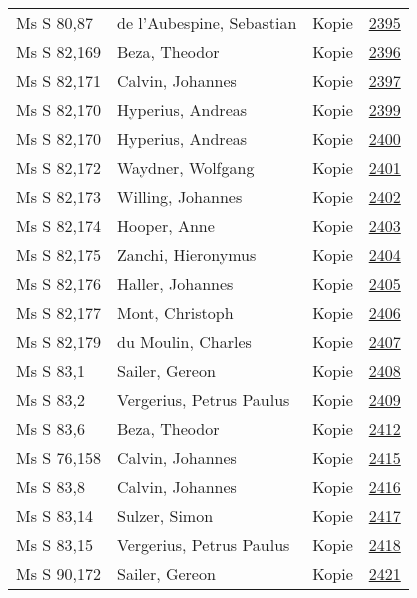 \documentclass[10pt,a4paper,landscape]{report}
\begin{document}
\begin{longtable}{p{16cm}p{4cm}lr}
Ms S 80,87	&	de l'Aubespine, Sebastian	&	Kopie	&	\href{http://130.60.24.72/assignment/2395}{2395}\\
Ms S 82,169	&	Beza, Theodor	&	Kopie	&	\href{http://130.60.24.72/assignment/2396}{2396}\\
Ms S 82,171	&	Calvin, Johannes	&	Kopie	&	\href{http://130.60.24.72/assignment/2397}{2397}\\
Ms S 82,170	&	Hyperius, Andreas	&	Kopie	&	\href{http://130.60.24.72/assignment/2399}{2399}\\
Ms S 82,170	&	Hyperius, Andreas	&	Kopie	&	\href{http://130.60.24.72/assignment/2400}{2400}\\
Ms S 82,172	&	Waydner, Wolfgang	&	Kopie	&	\href{http://130.60.24.72/assignment/2401}{2401}\\
Ms S 82,173	&	Willing, Johannes	&	Kopie	&	\href{http://130.60.24.72/assignment/2402}{2402}\\
Ms S 82,174	&	Hooper, Anne	&	Kopie	&	\href{http://130.60.24.72/assignment/2403}{2403}\\
Ms S 82,175	&	Zanchi, Hieronymus	&	Kopie	&	\href{http://130.60.24.72/assignment/2404}{2404}\\
Ms S 82,176	&	Haller, Johannes	&	Kopie	&	\href{http://130.60.24.72/assignment/2405}{2405}\\
Ms S 82,177	&	Mont, Christoph	&	Kopie	&	\href{http://130.60.24.72/assignment/2406}{2406}\\
Ms S 82,179	&	du Moulin, Charles	&	Kopie	&	\href{http://130.60.24.72/assignment/2407}{2407}\\
Ms S 83,1	&	Sailer, Gereon	&	Kopie	&	\href{http://130.60.24.72/assignment/2408}{2408}\\
Ms S 83,2	&	Vergerius, Petrus Paulus	&	Kopie	&	\href{http://130.60.24.72/assignment/2409}{2409}\\
Ms S 83,6	&	Beza, Theodor	&	Kopie	&	\href{http://130.60.24.72/assignment/2412}{2412}\\
Ms S 76,158	&	Calvin, Johannes	&	Kopie	&	\href{http://130.60.24.72/assignment/2415}{2415}\\
Ms S 83,8	&	Calvin, Johannes	&	Kopie	&	\href{http://130.60.24.72/assignment/2416}{2416}\\
Ms S 83,14	&	Sulzer, Simon	&	Kopie	&	\href{http://130.60.24.72/assignment/2417}{2417}\\
Ms S 83,15	&	Vergerius, Petrus Paulus	&	Kopie	&	\href{http://130.60.24.72/assignment/2418}{2418}\\
Ms S 90,172	&	Sailer, Gereon	&	Kopie	&	\href{http://130.60.24.72/assignment/2421}{2421}\\

\end{longtable}
\end{document}

